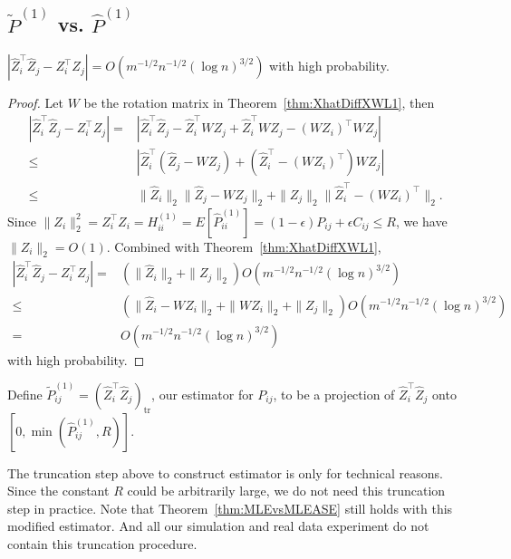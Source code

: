 \subsection{$\widetilde{P}^{(1)}$ vs. $\hat{P}^{(1)}$}
\label{section:pf_MLEvsMLEASE2}

\begin{lemma}
\label{lemma:1stMomentPhatDiffL1}
$\left|  \hat{Z}_i^{\top} \hat{Z}_j - Z_i^{\top} Z_j \right| = O(m^{-1/2} n^{-1/2} (\log n)^{3/2})$ with high probability.
\end{lemma}
\begin{proof}
Let $W$ be the rotation matrix in Theorem~\ref{thm:XhatDiffXWL1}, then
\begin{align*}
	\left|  \hat{Z}_i^{\top} \hat{Z}_j - Z_i^{\top} Z_j \right|
    = & \left| \hat{Z}_i^{\top} \hat{Z}_j - \hat{Z}_i^{\top} W Z_j + \hat{Z}_i^{\top} W Z_j - (W Z_i)^{\top} W Z_j \right| \\
    \le & \left| \hat{Z}_i^{\top} (\hat{Z}_j - W Z_j) + (\hat{Z}_i^{\top} - (W Z_i)^{\top}) W Z_j \right| \\
    \le & \|\hat{Z}_i\|_2 \|\hat{Z}_j - W Z_j\|_2 + \|Z_j\|_2 \|\hat{Z}_i^{\top} - (W Z_i)^{\top}\|_2.
\end{align*}
Since $\|Z_i\|_2^2 = Z_i^{\top} Z_i = H^{(1)}_{ii} =  E[\hat{P}^{(1)}_{ii}] = (1-\epsilon) P_{ij} + \epsilon C_{ij} \le R$, we have $\|Z_i\|_2 = O(1)$.
Combined with Theorem~\ref{thm:XhatDiffXWL1},
\begin{align*}
    \left|  \hat{Z}_i^{\top} \hat{Z}_j - Z_i^{\top} Z_j \right|
    = & (\|\hat{Z}_i\|_2 + \|Z_j\|_2) O(m^{-1/2} n^{-1/2} (\log n)^{3/2}) \\
    \le & (\|\hat{Z}_i - W Z_i\|_2 + \|W Z_i\|_2 + \|Z_j\|_2) O(m^{-1/2} n^{-1/2} (\log n)^{3/2}) \\
    = & O(m^{-1/2} n^{-1/2} (\log n)^{3/2})
\end{align*}
with high probability.
\end{proof}

\begin{definition}
\label{def:truncationMLE}
Define $\widetilde{P}_{ij}^{(1)} = (\hat{Z}_i^{\top} \hat{Z}_j)_{\mathrm{tr}}$, our estimator for $P_{ij}$, to be a projection of $\hat{Z}_i^{\top} \hat{Z}_j$ onto $[0, \min(\hat{P}_{ij}^{(1)}, R)]$.
\end{definition}

\begin{remark}
\label{remark:truncation}
The truncation step above to construct estimator is only for technical reasons. Since the constant $R$ could be arbitrarily large, we do not need this truncation step in practice. Note that Theorem~\ref{thm:MLEvsMLEASE} still holds with this modified estimator. And all our simulation and real data experiment do not contain this truncation procedure.
\end{remark}

